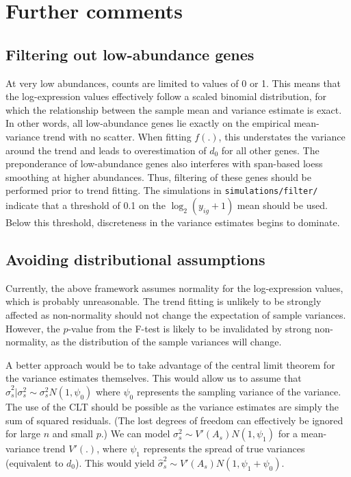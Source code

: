 \documentclass{article}
\begin{document}
\section{Further comments}

\subsection{Filtering out low-abundance genes}
At very low abundances, counts are limited to values of 0 or 1.
This means that the log-expression values effectively follow a scaled binomial distribution, for which the relationship between the sample mean and variance estimate is exact.
In other words, all low-abundance genes lie exactly on the empirical mean-variance trend with no scatter.
When fitting $f(.)$, this understates the variance around the trend and leads to overestimation of $d_0$ for all other genes.
The preponderance of low-abundance genes also interferes with span-based loess smoothing at higher abundances.
Thus, filtering of these genes should be performed prior to trend fitting.
The simulations in \texttt{simulations/filter/} indicate that a threshold of 0.1 on the $\log_2(y_{ig}+1)$ mean should be used.
Below this threshold, discreteness in the variance estimates begins to dominate.

\subsection{Avoiding distributional assumptions}
Currently, the above framework assumes normality for the log-expression values, which is probably unreasonable.
The trend fitting is unlikely to be strongly affected as non-normality should not change the expectation of sample variances.
However, the $p$-value from the F-test is likely to be invalidated by strong non-normality, as the distribution of the sample variances will change.

A better approach would be to take advantage of the central limit theorem for the variance estimates themselves.
This would allow us to assume that $\hat\sigma^2_s|\sigma^2_s \sim \sigma^2_s N(1, \psi_0)$ where $\psi_0$ represents the sampling variance of the variance.
The use of the CLT should be possible as the variance estimates are simply the sum of squared residuals.
(The lost degrees of freedom can effectively be ignored for large $n$ and small $p$.)
We can model $\sigma^2_s \sim V'(A_s)N(1, \psi_1)$ for a mean-variance trend $V'(.)$, where $\psi_1$ represents the spread of true variances (equivalent to $d_0$).
This would yield $\hat\sigma^2_s \sim V'(A_s)N(1, \psi_1 + \psi_0)$.
\end{document}
